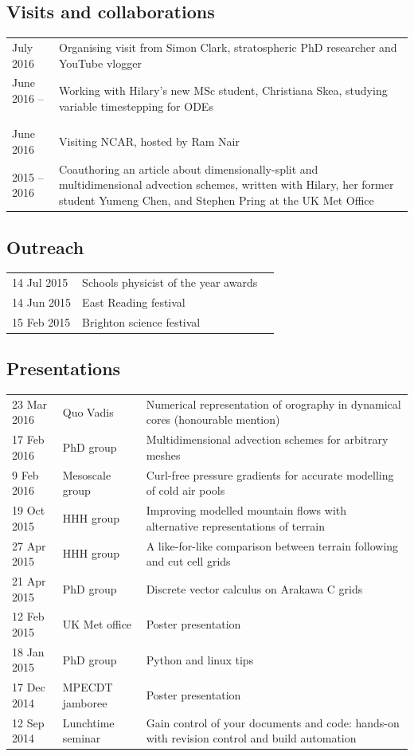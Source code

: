 \documentclass[a4paper,11pt]{article}
\begin{document}
\subsection*{Visits and collaborations}
\begin{tabularx}{\linewidth}{l X}
July 2016 & Organising visit from Simon Clark, stratospheric PhD researcher and YouTube vlogger \\
June 2016 --\ & Working with Hilary's new MSc student, Christiana Skea, studying variable timestepping for ODEs \\
June 2016 & Visiting NCAR, hosted by Ram Nair \\
2015 -- 2016 & Coauthoring an article about dimensionally-split and multidimensional advection schemes, written with Hilary, her former student Yumeng Chen, and Stephen Pring at the UK Met Office \\
\end{tabularx}


\subsection*{Outreach}
\begin{tabular}{l l l}
14 Jul 2015 & Schools physicist of the year awards \\
14 Jun 2015 & East Reading festival \\
15 Feb 2015 & Brighton science festival \\
\end{tabular}

\subsection*{Presentations}
\begin{tabularx}{\linewidth}{l l X}
23 Mar 2016 & Quo Vadis & Numerical representation of orography in dynamical cores (honourable mention) \\
17 Feb 2016 & PhD group & Multidimensional advection schemes for arbitrary meshes \\
9 Feb 2016 & Mesoscale group & Curl-free pressure gradients for accurate modelling of cold air pools \\
19 Oct 2015 & HHH group & Improving modelled mountain flows with alternative representations of terrain \\
27 Apr 2015 & HHH group & A like-for-like comparison between terrain following and cut cell grids \\
21 Apr 2015 & PhD group & Discrete vector calculus on Arakawa C grids \\
12 Feb 2015 & UK Met office & Poster presentation \\
18 Jan 2015 & PhD group & Python and linux tips \\
17 Dec 2014 & MPECDT jamboree & Poster presentation \\
12 Sep 2014 & Lunchtime seminar  & Gain control of your documents and code: hands-on with revision control and build automation \\
\end{tabularx}

                                                 

\end{document}
